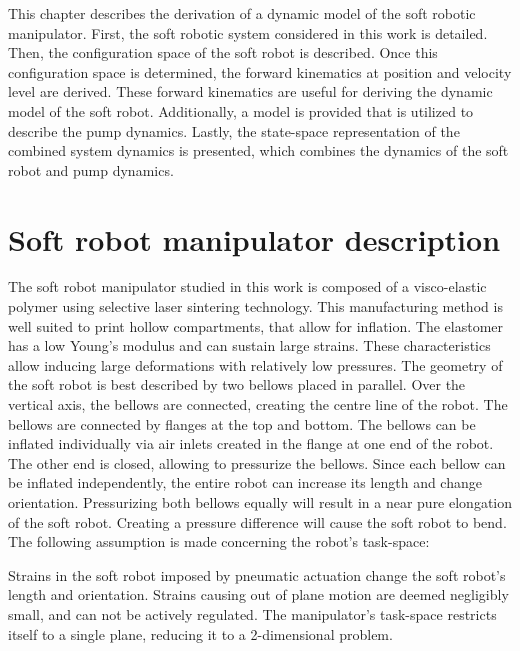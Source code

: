 \label{chap2}

This chapter describes the derivation of a dynamic model of the soft robotic manipulator. First, the soft robotic system considered in this work is detailed. Then, the configuration space of the soft robot is described. Once this configuration space is determined, the forward kinematics at position and velocity level are derived. These forward kinematics are useful for deriving the dynamic model of the soft robot. Additionally, a model is provided that is utilized to describe the pump dynamics. Lastly, the state-space representation of the combined system dynamics is presented, which combines the dynamics of the soft robot and pump dynamics.



\section{Soft robot manipulator description}

The soft robot manipulator studied in this work is composed of a visco-elastic polymer using selective laser sintering technology. This manufacturing method is well suited to print hollow compartments, that allow for inflation. The elastomer has a low Young's modulus and can sustain large strains. These characteristics allow inducing large deformations with relatively low pressures. The geometry of the soft robot is best described by two bellows placed in parallel. Over the vertical axis, the bellows are connected, creating the centre line of the robot. The bellows are connected by flanges at the top and bottom. The bellows can be inflated individually via air inlets created in the flange at one end of the robot. The other end is closed, allowing to pressurize the bellows. Since each bellow can be inflated independently, the entire robot can increase its length and change orientation. Pressurizing both bellows equally will result in a near pure elongation of the soft robot. Creating a pressure difference will cause the soft robot to bend. The following assumption is made concerning the robot's task-space:

\begin{theorem}
Strains in the soft robot imposed by pneumatic actuation change the soft robot's length and orientation. Strains causing out of plane motion are deemed negligibly small, and can not be actively regulated. The manipulator's task-space restricts itself to a single plane, reducing it to a 2-dimensional problem.
\end{theorem}

